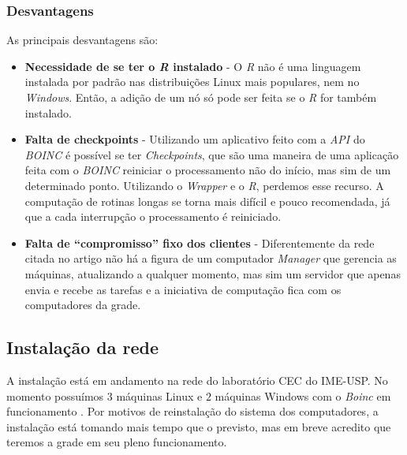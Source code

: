 \subsubsection{Desvantagens}

As principais desvantagens são:

\begin{itemize}
  \item \textbf{Necessidade de se ter o \emph{R} instalado} - O \emph{R} não é uma linguagem instalada por padrão
nas distribuições Linux mais populares, nem no \emph{Windows}. Então, a adição de um nó só pode ser feita se o \emph{R}
for também instalado. 
  \item \textbf{Falta de checkpoints} - Utilizando um aplicativo feito com a \emph{API} do \emph{BOINC} é possível se ter
\emph{Checkpoints}, que são uma maneira de uma aplicação feita com o \emph{BOINC} reiniciar o processamento
não do início, mas sim de um determinado ponto. Utilizando o \emph{Wrapper} e o \emph{R}, perdemos esse recurso. A computação
de rotinas longas se torna mais difícil e pouco recomendada, já que a cada interrupção o processamento é reiniciado. 
  \item \textbf{Falta de ``compromisso'' fixo dos clientes} - Diferentemente da rede citada no artigo \cite{Dias}
não há a figura de um computador \emph{Manager} que gerencia as máquinas, atualizando a qualquer momento, mas sim um servidor 
que apenas envia e recebe as tarefas e a iniciativa de computação fica com os computadores da grade. 

\end{itemize}

\subsection{Instalação da rede}

A instalação está em andamento na rede do laboratório CEC do IME-USP. No momento possuímos $3$ máquinas Linux e $2$ máquinas Windows com o \emph{Boinc}
em funcionamento . Por motivos de reinstalação do sistema dos computadores, a instalação está tomando 
mais tempo que o previsto, mas em breve acredito que teremos a grade em seu pleno funcionamento.


